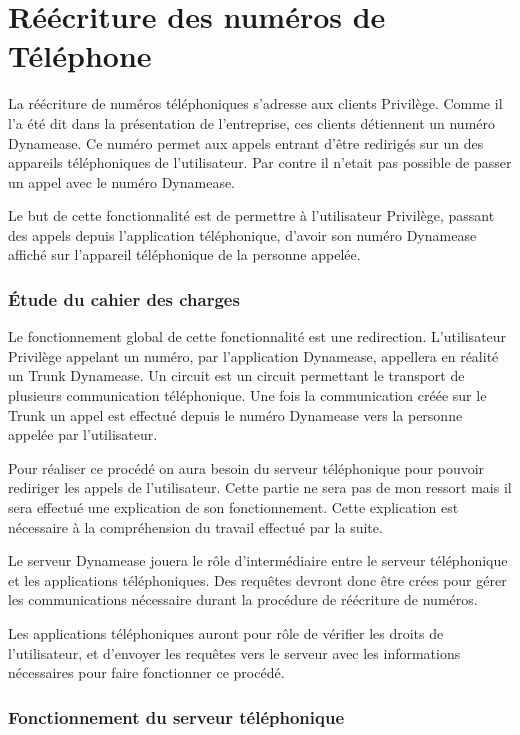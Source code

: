 \section{Réécriture des numéros de Téléphone}

La réécriture de numéros téléphoniques s'adresse aux clients Privilège. Comme il l'a été dit dans la présentation de l'entreprise, ces clients détiennent un numéro Dynamease. Ce numéro permet aux appels entrant d'être redirigés sur un des appareils téléphoniques de l'utilisateur. Par contre il n'etait pas possible de passer un appel avec le numéro Dynamease.

Le but de cette fonctionnalité est de permettre à l'utilisateur Privilège, passant des appels depuis l'application téléphonique, d'avoir son numéro Dynamease affiché sur l'appareil téléphonique de la personne appelée.

\subsubsection{Étude du cahier des charges}

Le fonctionnement global de cette fonctionnalité est une redirection. L'utilisateur Privilège appelant un numéro, par l'application Dynamease, appellera en réalité un Trunk Dynamease. Un circuit est un circuit permettant le transport de plusieurs communication téléphonique. Une fois la communication créée sur le Trunk un appel est effectué depuis le numéro Dynamease vers la personne appelée par l'utilisateur.

Pour réaliser ce procédé on aura besoin du serveur téléphonique pour pouvoir rediriger les appels de l'utilisateur. Cette partie ne sera pas de mon ressort mais il sera effectué une explication de son fonctionnement. Cette explication est nécessaire à la compréhension du travail effectué par la suite.

Le serveur Dynamease jouera le rôle d'intermédiaire entre le serveur téléphonique et les applications téléphoniques. Des requêtes devront donc être crées pour gérer les communications nécessaire durant la procédure de réécriture de numéros.

Les applications téléphoniques auront pour rôle de vérifier les droits de l'utilisateur, et d'envoyer les requêtes vers le serveur avec les informations nécessaires pour faire fonctionner ce procédé.

\subsubsection{Fonctionnement du serveur téléphonique}

